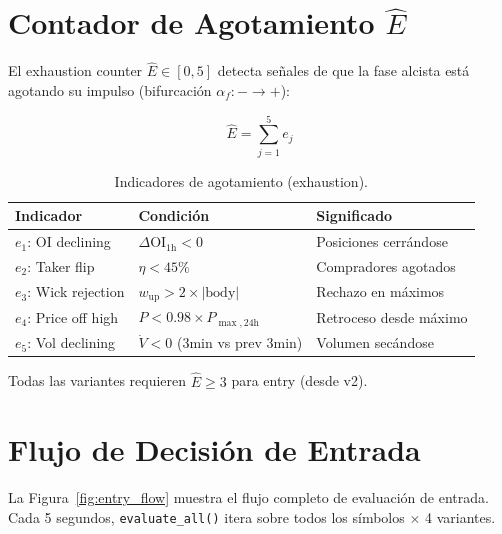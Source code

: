 \documentclass[11pt,a4paper]{article}
\newcommand{\af}{\alpha_f}
\newcommand{\exh}{\hat{E}}
\newcommand{\code}[1]{\texttt{\small #1}}
\begin{document}
\section{Contador de Agotamiento $\exh$}
\label{sec:exhaustion}

El exhaustion counter $\exh \in [0, 5]$ detecta se\~nales de que la
fase alcista est\'a agotando su impulso (bifurcaci\'on $\af: - \to +$):

\begin{equation}
\exh = \sum_{j=1}^{5} e_j
\label{eq:exhaustion}
\end{equation}

\begin{table}[H]
\centering
\caption{Indicadores de agotamiento (exhaustion).}
\label{tab:exhaustion}
\begin{tabularx}{\textwidth}{lXl}
\toprule
\textbf{Indicador} & \textbf{Condici\'on} & \textbf{Significado} \\
\midrule
$e_1$: OI declining & $\Delta\text{OI}_{1\text{h}} < 0$ & Posiciones cerr\'andose \\
$e_2$: Taker flip & $\eta < 45\%$ & Compradores agotados \\
$e_3$: Wick rejection & $w_{\text{up}} > 2 \times |\text{body}|$ & Rechazo en m\'aximos \\
$e_4$: Price off high & $P < 0.98 \times P_{\max,24\text{h}}$ & Retroceso desde m\'aximo \\
$e_5$: Vol declining & $\dot{V} < 0$ (3min vs prev 3min) & Volumen sec\'andose \\
\bottomrule
\end{tabularx}
\end{table}

Todas las variantes requieren $\exh \geq 3$ para entry (desde v2).


\section{Flujo de Decisi\'on de Entrada}
\label{sec:entry}

La Figura~\ref{fig:entry_flow} muestra el flujo completo de evaluaci\'on
de entrada. Cada 5 segundos, \code{evaluate\_all()} itera sobre todos
los s\'imbolos $\times$ 4 variantes.
\end{document}
